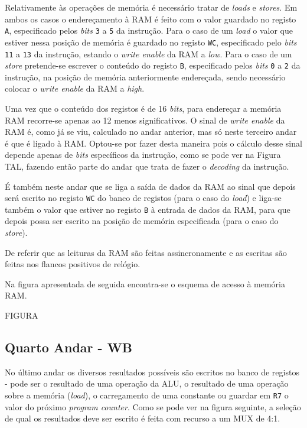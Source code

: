 \documentclass[11pt]{article}
\numberwithin{equation}{section}
\begin{document}
Relativamente às operações de memória é necessário tratar de \textit{loads} e \textit{stores}. Em ambos os casos o endereçamento à RAM é feito com o valor guardado no registo \texttt{A}, especificado pelos \textit{bits} \texttt{3} a \texttt{5} da instrução. Para o caso de um \textit{load} o valor que estiver nessa posição de memória é guardado no registo \texttt{WC}, especificado pelo \textit{bits} \texttt{11} a \texttt{13} da instrução, estando o \textit{write enable} da RAM a \textit{low}. Para o caso de um \textit{store} pretende-se escrever o conteúdo do registo \texttt{B}, especificado pelos \textit{bits} \texttt{0} a \texttt{2} da instrução, na posição de memória anteriormente endereçada, sendo necessário colocar o \textit{write enable} da RAM a \textit{high}. 

Uma vez que o conteúdo dos registos é de 16 \textit{bits}, para endereçar a memória RAM recorre-se apenas ao 12 menos significativos. O sinal de \textit{write enable} da RAM é, como já se viu, calculado no andar anterior, mas só neste terceiro andar é que é ligado à RAM. Optou-se por fazer desta maneira pois o cálculo desse sinal depende apenas de \textit{bits} específicos da instrução, como se pode ver na Figura TAL, fazendo então parte do andar que trata de fazer o \textit{decoding} da instrução.

É também neste andar que se liga a saída de dados da RAM ao sinal que depois será escrito no registo \texttt{WC} do banco de registos (para o caso do \textit{load}) e liga-se também o valor que estiver no registo \texttt{B} à entrada de dados da RAM, para que depois possa ser escrito na posição de memória especificada (para o caso do \textit{store}).

De referir que as leituras da RAM são feitas assincronamente e as escritas são feitas nos flancos positivos de relógio. 

Na figura apresentada de seguida encontra-se o esquema de acesso à memória RAM.

FIGURA

\subsection{Quarto Andar - WB}

No último andar os diversos resultados possíveis são escritos no banco de registos - pode ser o resultado de uma operação da ALU, o resultado de uma operação sobre a memória (\textit{load}), o carregamento de uma constante ou guardar em \texttt{R7} o valor do próximo \textit{program counter}. Como se pode ver na figura seguinte, a seleção de qual os resultados deve ser escrito é feita com recurso a um MUX de 4:1. 
\end{document}
